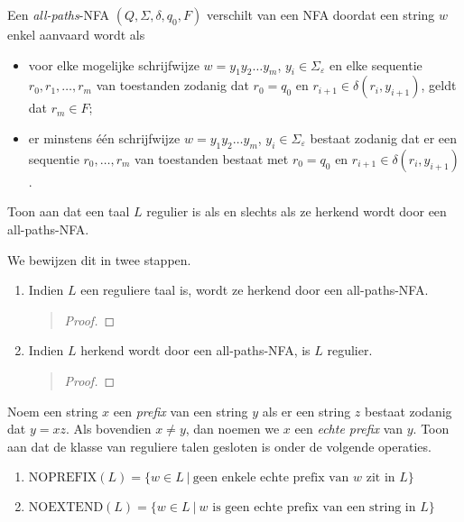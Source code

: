 \documentclass[a4paper]{article}
\begin{document}
\begin{question}
Een \emph{all-paths}-NFA $(Q,\Sigma,\delta,q_0,F)$ verschilt van een NFA doordat een string $w$ enkel aanvaard wordt als 
\begin{itemize}
  \item voor elke mogelijke schrijfwijze $w = y_1 y_2 \ldots y_m$, $y_i \in \Sigma_{\varepsilon}$ en elke sequentie $r_0, r_1, \ldots, r_m$ van toestanden zodanig dat $r_0 = q_0$ en $r_{i+1} \in \delta(r_i,y_{i+1})$, geldt dat $r_m \in F$;
  \item er minstens \'e\'en schrijfwijze $w = y_1 y_2 \ldots y_m$, $y_i \in \Sigma_{\varepsilon}$ bestaat zodanig dat er een sequentie $r_0, \ldots, r_m$ van toestanden bestaat met $r_0 = q_0$ en $r_{i+1} \in \delta(r_i,y_{i+1})$.
\end{itemize}
Toon aan dat een taal $L$ regulier is als en slechts als ze herkend wordt door een all-paths-NFA.
\begin{answer}
We bewijzen dit in twee stappen.
\begin{enumerate}
 \item Indien $L$ een reguliere taal is, wordt ze herkend door een all-paths-NFA.
\begin{quotation}
\begin{proof}

\end{proof}
\end{quotation}
\item Indien $L$ herkend wordt door een all-paths-NFA, is $L$ regulier.
\begin{quotation}
\begin{proof}

\end{proof}
\end{quotation}
\end{enumerate}

\end{answer}

\end{question}

\begin{question}
Noem een string $x$ een \emph{prefix} van een string $y$ als er een string $z$ bestaat zodanig dat $y = xz$. Als bovendien $x \neq y$, dan noemen we $x$ een \emph{echte prefix} van $y$. Toon aan dat de klasse van reguliere talen gesloten is onder de volgende operaties.
\begin{enumerate}
  \item $\mathrm{NOPREFIX} (L) = \{ w \in L \ | \ \mbox{geen enkele echte prefix van $w$ zit in $L$} \}$
  \item $\mathrm{NOEXTEND} (L) = \{ w \in L \ | \ \mbox{$w$ is geen echte prefix van een string in $L$} \}$
\end{enumerate}
\end{question}
\end{document}
